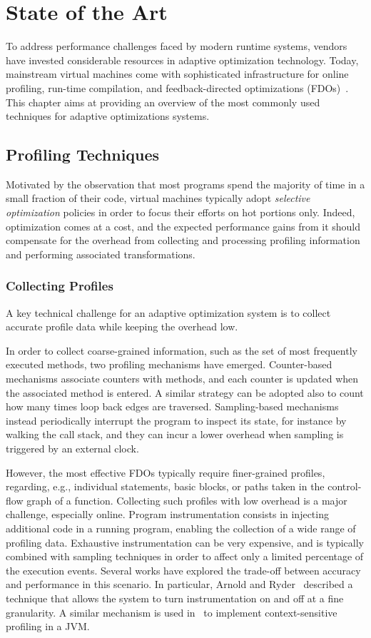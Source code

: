 \chapter{State of the Art}
\label{ch:literature}

To address performance challenges faced by modern runtime systems, vendors have invested considerable resources in adaptive optimization technology. Today, mainstream virtual machines come with sophisticated infrastructure for online profiling, run-time compilation, and feedback-directed optimizations (FDOs)~\cite{Arnold05}. This chapter aims at providing an overview of the most commonly used techniques for adaptive optimizations systems.

\section{Profiling Techniques}
Motivated by the observation that most programs spend the majority of time in a small fraction of their code, virtual machines typically adopt {\em selective optimization} policies in order to focus their efforts on hot portions only. Indeed, optimization comes at a cost, and the expected performance gains from it should compensate for the overhead from collecting and processing profiling information and performing associated transformations.

\subsection*{Collecting Profiles}
A key technical challenge for an adaptive optimization system is to collect accurate profile data while keeping the overhead low.

In order to collect coarse-grained information, such as the set of most frequently executed methods, two profiling mechanisms have emerged. Counter-based mechanisms associate counters with methods, and each counter is updated when the associated method is entered. A similar strategy can be adopted also to count how many times loop back edges are traversed. Sampling-based mechanisms instead periodically interrupt the program to inspect its state, for instance by walking the call stack, and they can incur a lower overhead when sampling is triggered by an external clock.

However, the most effective FDOs typically require finer-grained profiles, regarding, e.g., individual statements, basic blocks, or paths taken in the control-flow graph of a function. Collecting such profiles with low overhead is a major challenge, especially online. Program instrumentation consists in injecting additional code in a running program, enabling the collection of a wide range of profiling data. Exhaustive instrumentation can be very expensive, and is typically combined with sampling techniques in order to affect only a limited percentage of the execution events. Several works have explored the trade-off between accuracy and performance in this scenario. In particular, Arnold and Ryder~\cite{Arnold01} described a technique that allows the system to turn instrumentation on and off at a fine granularity. A similar mechanism is used in~\cite{Zhuang06} to implement context-sensitive profiling in a JVM.

